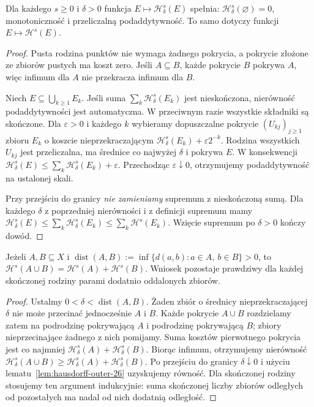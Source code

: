 \begin{lemat}
\label{lem:hausdorff-outer-26}
Dla każdego $s\geq0$ i $\delta>0$ funkcja
$E\mapsto\mathcal H^s_\delta(E)$ spełnia:
$\mathcal H^s_\delta(\varnothing)=0$,
monotoniczność i przeliczalną podaddytywność.
To samo dotyczy funkcji $E\mapsto\mathcal H^s(E)$.
\end{lemat}
\begin{proof}
Pusta rodzina punktów nie wymaga żadnego pokrycia,
a pokrycie złożone ze zbiorów pustych ma koszt zero.
Jeśli $A\subseteq B$, każde pokrycie $B$ pokrywa $A$,
więc infimum dla $A$ nie przekracza infimum dla $B$.

Niech $E\subseteq\bigcup_{k\ge1}E_k$. Jeśli suma
$\sum_k\mathcal H^s_\delta(E_k)$ jest nieskończona,
nierówność podaddytywności jest automatyczna.
W przeciwnym razie wszystkie składniki są skończone.
Dla $\varepsilon>0$ i każdego $k$ wybieramy dopuszczalne
pokrycie $(U_{kj})_{j\ge1}$ zbioru $E_k$ o koszcie
nieprzekraczającym
$\mathcal H^s_\delta(E_k)+\varepsilon2^{-k}$.
Rodzina wszystkich $U_{kj}$ jest przeliczalna,
ma średnice co najwyżej $\delta$ i pokrywa $E$.
W konsekwencji
$\mathcal H^s_\delta(E)\leq
\sum_k\mathcal H^s_\delta(E_k)+\varepsilon$.
Przechodząc $\varepsilon\downarrow0$, otrzymujemy
podaddytywność na ustalonej skali.

Przy przejściu do granicy \emph{nie zamieniamy}
supremum z nieskończoną sumą. Dla każdego $\delta$
z poprzedniej nierówności i z definicji supremum mamy
$\mathcal H^s_\delta(E)\leq
\sum_k\mathcal H^s_\delta(E_k)
\leq\sum_k\mathcal H^s(E_k)$.
Wzięcie supremum po $\delta>0$ kończy dowód.
\end{proof}

\begin{lemat}
\label{lem:hausdorff-metricity-26}
Jeżeli $A,B\subseteq X$ i
$\operatorname{dist}(A,B):=
\inf\{d(a,b):a\in A,\ b\in B\}>0$,
to $\mathcal H^s(A\cup B)=\mathcal H^s(A)+\mathcal H^s(B)$.
Wniosek pozostaje prawdziwy dla każdej skończonej
rodziny parami dodatnio oddalonych zbiorów.
\end{lemat}
\begin{proof}
Ustalmy $0<\delta<\operatorname{dist}(A,B)$.
Żaden zbiór o średnicy nieprzekraczającej $\delta$
nie może przecinać jednocześnie $A$ i $B$.
Każde pokrycie $A\cup B$ rozdzielamy zatem na
podrodzinę pokrywającą $A$ i podrodzinę pokrywającą
$B$; zbiory nieprzecinające żadnego z nich pomijamy.
Suma kosztów pierwotnego pokrycia jest co najmniej
$\mathcal H^s_\delta(A)+\mathcal H^s_\delta(B)$.
Biorąc infimum, otrzymujemy nierówność
$\mathcal H^s_\delta(A\cup B)\geq
\mathcal H^s_\delta(A)+\mathcal H^s_\delta(B)$.
Po przejściu do granicy $\delta\downarrow0$
i użyciu lematu~\ref{lem:hausdorff-outer-26}
uzyskujemy równość. Dla skończonej rodziny
stosujemy ten argument indukcyjnie: suma skończonej
liczby zbiorów odległych od pozostałych ma nadal
od nich dodatnią odległość.
\end{proof}

